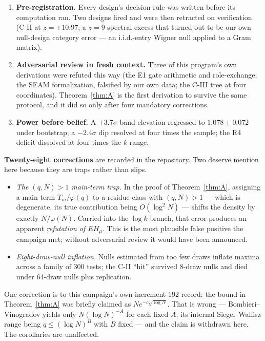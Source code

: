 \documentclass[11pt,a4paper]{article}
\theoremstyle{plain}
\theoremstyle{definition}
\begin{document}
\begin{enumerate}
\item \textbf{Pre-registration.} Every design's decision rule was
  written before its computation ran. Two designs fired and were then
  retracted on verification (C-II at $z = +10.97$; a $z = 9$ spectral
  excess that turned out to be our own null-design category error ---
  an i.i.d.-entry Wigner null applied to a Gram matrix).
\item \textbf{Adversarial review in fresh context.} Three of this
  program's own derivations were refuted this way (the E1 gate
  arithmetic and role-exchange; the SEAM formalization, falsified by
  our own data; the C-III tree at four coordinates). Theorem~\ref{thm:A}
  is the first derivation to survive the same protocol, and it did so
  only after four mandatory corrections.
\item \textbf{Power before belief.} A $+3.7\sigma$ band elevation
  regressed to $1.078\pm0.072$ under bootstrap; a $-2.4\sigma$ dip
  resolved at four times the sample; the R4 deficit dissolved at four
  times the $k$-range.
\end{enumerate}

\noindent
\textbf{Twenty-eight corrections} are recorded in the repository. Two
deserve mention here because they are traps rather than slips.

\begin{itemize}
\item \emph{The $(q,N)>1$ main-term trap.} In the proof of
  Theorem~\ref{thm:A}, assigning a main term $T_m/\varphi(q)$ to a
  residue class with $(q,N)>1$ --- which is degenerate, its true
  contribution being $O(\log^2 N)$ --- shifts the density by exactly
  $N/\varphi(N)$. Carried into the $\log k$ branch, that error
  produces an apparent \emph{refutation of $EH_\mu$}. This is the most
  plausible false positive the campaign met; without adversarial
  review it would have been announced.
\item \emph{Eight-draw-null inflation.} Nulls estimated from too few
  draws inflate maxima across a family of 300 tests; the C-II ``hit''
  survived 8-draw nulls and died under 64-draw nulls plus replication.
\end{itemize}

\noindent
One correction is to this campaign's own increment-192 record: the
bound in Theorem~\ref{thm:A} was briefly claimed as
$Ne^{-c\sqrt{\log N}}$. That is wrong --- Bombieri--Vinogradov yields
only $N(\log N)^{-A}$ for each fixed $A$, its internal Siegel--Walfisz
range being $q \le (\log N)^B$ with $B$ fixed --- and the claim is
withdrawn here. The corollaries are unaffected.
\end{document}
